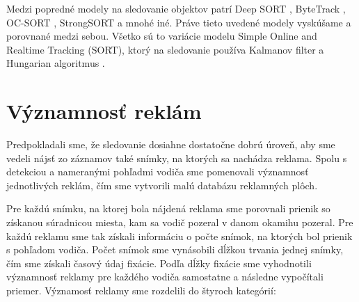 Medzi popredné modely na sledovanie objektov patrí Deep SORT \cite{deepsort}, ByteTrack \cite{bytetrack}, OC-SORT \cite{ocsort}, StrongSORT \cite{strongsort} a mnohé iné. Práve tieto uvedené modely vyskúšame a porovnané medzi sebou. Všetko sú to variácie modelu Simple Online and Realtime Tracking (SORT), ktorý na sledovanie používa Kalmanov filter a Hungarian algoritmus \cite{sort}.



\section{Významnosť reklám}

Predpokladali sme, že sledovanie dosiahne dostatočne dobrú úroveň, aby sme vedeli nájsť zo záznamov také snímky, na ktorých sa nachádza reklama. Spolu s detekciou a nameranými pohľadmi vodiča sme pomenovali významnosť jednotlivých reklám, čím sme vytvorili malú databázu reklamných plôch. 

Pre každú snímku, na ktorej bola nájdená reklama sme porovnali prienik so získanou súradnicou miesta, kam sa vodič pozeral v danom okamihu pozeral. Pre každú reklamu sme tak získali informáciu o počte snímok, na ktorých bol prienik s pohľadom vodiča. Počet snímok sme vynásobili dĺžkou trvania jednej snímky, čím sme získali časový údaj fixácie. Podľa dĺžky fixácie sme vyhodnotili významnosť reklamy pre každého vodiča samostatne a následne vypočítali priemer. Významosť reklamy sme rozdelili do štyroch kategórií: 

